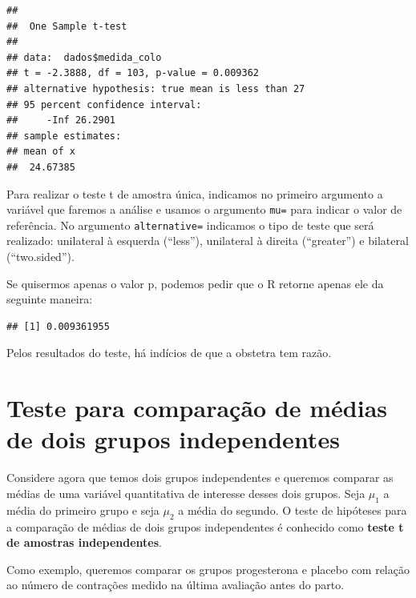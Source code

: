 \documentclass[
]{book}
\newenvironment{Shaded}{\begin{snugshade}}{\end{snugshade}}
\newcommand{\DataTypeTok}[1]{\textcolor[rgb]{0.13,0.29,0.53}{#1}}
\newcommand{\DecValTok}[1]{\textcolor[rgb]{0.00,0.00,0.81}{#1}}
\newcommand{\KeywordTok}[1]{\textcolor[rgb]{0.13,0.29,0.53}{\textbf{#1}}}
\newcommand{\NormalTok}[1]{#1}
\newcommand{\OperatorTok}[1]{\textcolor[rgb]{0.81,0.36,0.00}{\textbf{#1}}}
\newcommand{\StringTok}[1]{\textcolor[rgb]{0.31,0.60,0.02}{#1}}
\begin{document}
\begin{verbatim}
## 
## 	One Sample t-test
## 
## data:  dados$medida_colo
## t = -2.3888, df = 103, p-value = 0.009362
## alternative hypothesis: true mean is less than 27
## 95 percent confidence interval:
##     -Inf 26.2901
## sample estimates:
## mean of x 
##  24.67385
\end{verbatim}

Para realizar o teste t de amostra única, indicamos no primeiro argumento a variável que faremos a análise e usamos o argumento \texttt{mu=} para indicar o valor de referência. No argumento \texttt{alternative=} indicamos o tipo de teste que será realizado: unilateral à esquerda (``less''), unilateral à direita (``greater'') e bilateral (``two.sided'').

Se quisermos apenas o valor p, podemos pedir que o R retorne apenas ele da seguinte maneira:

\begin{Shaded}
\end{Shaded}

\begin{verbatim}
## [1] 0.009361955
\end{verbatim}

Pelos resultados do teste, há indícios de que a obstetra tem razão.

\hypertarget{teste-para-comparauxe7uxe3o-de-muxe9dias-de-dois-grupos-independentes}{%
\section{Teste para comparação de médias de dois grupos independentes}\label{teste-para-comparauxe7uxe3o-de-muxe9dias-de-dois-grupos-independentes}}

Considere agora que temos dois grupos independentes e queremos comparar as médias de uma variável quantitativa de interesse desses dois grupos. Seja \(\mu_1\) a média do primeiro grupo e seja \(\mu_2\) a média do segundo. O teste de hipóteses para a comparação de médias de dois grupos independentes é conhecido como \textbf{teste t de amostras independentes}.

Como exemplo, queremos comparar os grupos progesterona e placebo com relação ao número de contrações medido na última avaliação antes do parto.
\end{document}
